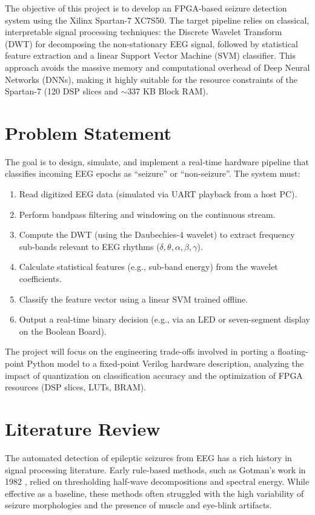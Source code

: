 \documentclass[10pt,twocolumn,letterpaper]{article}
\begin{document}
The objective of this project is to develop an FPGA-based seizure detection system using the Xilinx Spartan-7 XC7S50. The target pipeline relies on classical, interpretable signal processing techniques: the Discrete Wavelet Transform (DWT) for decomposing the non-stationary EEG signal, followed by statistical feature extraction and a linear Support Vector Machine (SVM) classifier. This approach avoids the massive memory and computational overhead of Deep Neural Networks (DNNs), making it highly suitable for the resource constraints of the Spartan-7 (120 DSP slices and $\sim$337 KB Block RAM).

\section{Problem Statement}
The goal is to design, simulate, and implement a real-time hardware pipeline that classifies incoming EEG epochs as ``seizure'' or ``non-seizure''. The system must:
\begin{enumerate}
    \item Read digitized EEG data (simulated via UART playback from a host PC).
    \item Perform bandpass filtering and windowing on the continuous stream.
    \item Compute the DWT (using the Daubechies-4 wavelet) to extract frequency sub-bands relevant to EEG rhythms ($\delta, \theta, \alpha, \beta, \gamma$).
    \item Calculate statistical features (e.g., sub-band energy) from the wavelet coefficients.
    \item Classify the feature vector using a linear SVM trained offline.
    \item Output a real-time binary decision (e.g., via an LED or seven-segment display on the Boolean Board).
\end{enumerate}

The project will focus on the engineering trade-offs involved in porting a floating-point Python model to a fixed-point Verilog hardware description, analyzing the impact of quantization on classification accuracy and the optimization of FPGA resources (DSP slices, LUTs, BRAM).

\section{Literature Review}
The automated detection of epileptic seizures from EEG has a rich history in signal processing literature. Early rule-based methods, such as Gotman's work in 1982 \cite{gotman1982}, relied on thresholding half-wave decompositions and spectral energy. While effective as a baseline, these methods often struggled with the high variability of seizure morphologies and the presence of muscle and eye-blink artifacts.
\end{document}
